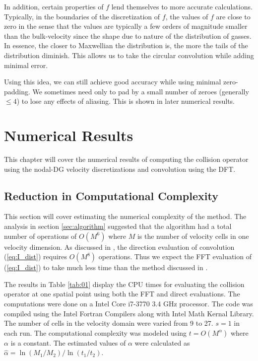 \documentclass[12pt]{CSUNthesis}
\begin{document}
In addition, certain properties of $f$ lend themselves to more accurate calculations. 
Typically, in the boundaries of the discretization of $f$, the values of $f$ are close to zero in the sense that the values are typically a few orders of magnitude smaller than the bulk-velocity since the shape due to nature of the distribution of gasses. In essence, the closer to Maxwellian the distribution is, the more the tails of the distribution diminish. This allows us to take the circular convolution while adding minimal error.

Using this idea, we can still achieve good accuracy while using minimal zero-padding. We sometimes need only to pad by a small number of zeroes (generally $\leq 4$) to lose any effects of aliasing. This is shown in later numerical results.



\chapter{Numerical Results}
\label{chap:numerical_results}
This chapter will cover the numerical results of computing the collision operator using the nodal-DG velocity discretizations and convolution using the DFT. 

\section{Reduction in Computational Complexity}

This section will cover estimating the numerical complexity of the method. 
The analysis in section \ref{sec:algorithm} suggested that the algorithm had a total number of operations of $O(M^6)$ where $M$ is the number of velocity cells in one velocity dimension. 
As discussed in \cite{AlekseenkoJosyula2012a}, the direction evaluation of convolution (\ref{eq:I_dist}) requires $O(M^8)$ operations. Thus we expect the FFT evaluation of (\ref{eq:I_dist}) to take much less time than the method discussed in \cite{AlekseenkoJosyula2012a}.

The results in Table \ref{tab:01} display the CPU times for evaluating the collision operator at one spatial point using both the FFT and direct evaluations. 
The computations were done on a Intel Core i7-3770 3.4 GHz processor. 
The code was compiled using the Intel Fortran Compilers along with Intel Math Kernal Library.
The number of cells in the velocity domain were varied from 9 to 27. $s=1$ in each run. 
The computational complexity was modeled using $t=O(M^\alpha)$ where $\alpha$ is a constant. 
The estimated values of $\alpha$ were calculated as $\hat{\alpha}=\ln(M_{1}/M_{2})/\ln(t_{1}/t_{2})$. 
\end{document}
